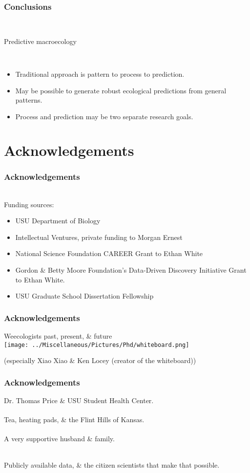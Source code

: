 \documentclass[14pt]{beamer}
\begin{document}
\begin{frame}[t]{}
\frametitle{Conclusions}\
~\\ 
\begin{large}
Predictive macroecology
\end{large}
~\\ 
\begin{itemize}
\item Traditional approach is pattern to process to prediction.
\item May be possible to generate robust ecological predictions from general patterns.
\item Process and prediction may be two separate research goals.
\end{itemize} 
\end{frame}

\section{Acknowledgements}
\begin{frame}[t]{}
\frametitle{Acknowledgements}
~\\ %
\small{Funding sources:}
\begin{small}
\begin{itemize}
\item USU Department of Biology
\item Intellectual Ventures, private funding to Morgan Ernest
\item National Science Foundation CAREER Grant to Ethan White
\item Gordon \& Betty Moore Foundation's Data-Driven Discovery Initiative Grant to Ethan White.
\item USU Graduate School Dissertation Fellowship
\end{itemize}
\end{small}
\end{frame}

\begin{frame}{}
\frametitle{Acknowledgements}
Weecologists past, present, \& future\\
\texttt{[image: ../Miscellaneous/Pictures/Phd/whiteboard.png]}
\begin{tiny}
(especially Xiao Xiao \& Ken Locey (creator of the whiteboard))
\end{tiny}
\end{frame}

\begin{frame}[t]{}
\frametitle{Acknowledgements}
Dr. Thomas Price \& USU Student Health Center.\\
~\\
Tea, heating pads, \& the Flint Hills of Kansas.\\
~\\
A very supportive husband \& family.\\
~\\
\begin{Large}
Publicly available data, \& the citizen scientists that make that possible.\\
\end{Large}
\end{frame}
\end{document}
